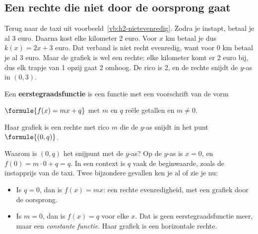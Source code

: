 \subsection{Een rechte die niet door de oorsprong gaat}

Terug naar de taxi uit voorbeeld~\ref{vb:h2-nietevenredig}. Zodra je instapt, betaal je al 3 euro. Daarna kost elke kilometer 2 euro. Voor $x$ km betaal je dus $k(x) = 2x + 3$ euro. Dat verband is niet recht evenredig, want voor 0 km betaal je al 3 euro. Maar de grafiek is wel een rechte: elke kilometer komt er 2 euro bij, dus elk trapje van 1 opzij gaat 2 omhoog. De rico is 2, en de rechte snijdt de $y$-as in $(0, 3)$.


\begin{theorie}
Een \textbf{\textcolor{accent}{eerstegraadsfunctie}} is een functie met een voorschrift van de vorm

\vspace{1mm}
\qquad $\formule{f(x) = mx + q}$ \qquad met $m$ en $q$ reële getallen en $m \neq 0$.

\vspace{1mm}
Haar grafiek is een rechte met rico $m$ die de $y$-as snijdt in het punt $\formule{(0, q)}$.
\end{theorie}

Waarom is $(0, q)$ het snijpunt met de $y$-as? Op de $y$-as is $x = 0$, en $f(0) = m \cdot 0 + q = q$. In een context is $q$ vaak de beginwaarde, zoals de instapprijs van de taxi. Twee bijzondere gevallen ken je al of zie je nu:
\begin{itemize}
\item Is $q = 0$, dan is $f(x) = mx$: een rechte evenredigheid, met een grafiek door de oorsprong.
\item Is $m = 0$, dan is $f(x) = q$ voor elke $x$. Dat is geen eerstegraadsfunctie meer, maar een \textit{constante functie}. Haar grafiek is een horizontale rechte.
\end{itemize}


